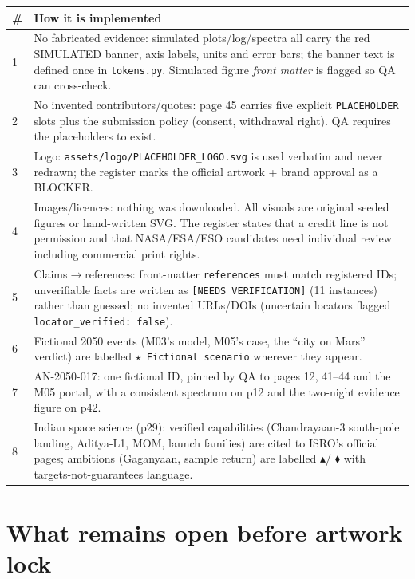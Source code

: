 \documentclass[11pt,a4paper]{article}
\newcommand{\code}[1]{\texttt{#1}}
\begin{document}
\begin{longtable}{p{8mm}p{138mm}}
\textbf{\#} & \textbf{How it is implemented}\\
\endhead
1 & No fabricated evidence: simulated plots/log/spectra all carry the red
SIMULATED banner, axis labels, units and error bars; the banner text is
defined once in \code{tokens.py}. Simulated figure \emph{front matter} is
flagged so QA can cross-check.\\
2 & No invented contributors/quotes: page 45 carries five explicit
\texttt{PLACEHOLDER} slots plus the submission policy (consent, withdrawal
right). QA requires the placeholders to exist.\\
3 & Logo: \code{assets/logo/PLACEHOLDER\_LOGO.svg} is used verbatim and never
redrawn; the register marks the official artwork + brand approval as a
BLOCKER.\\
4 & Images/licences: nothing was downloaded. All visuals are original seeded
figures or hand-written SVG. The register states that a credit line is not
permission and that NASA/ESA/ESO candidates need individual review including
commercial print rights.\\
5 & Claims$\to$references: front-matter \code{references} must match
registered IDs; unverifiable facts are written as
\texttt{[NEEDS VERIFICATION]} (11 instances) rather than guessed; no invented
URLs/DOIs (uncertain locators flagged \code{locator\_verified: false}).\\
6 & Fictional 2050 events (M03's model, M05's case, the ``city on Mars''
verdict) are labelled \texttt{$\star$ Fictional scenario} wherever they
appear.\\
7 & AN-2050-017: one fictional ID, pinned by QA to pages 12, 41--44 and the
M05 portal, with a consistent spectrum on p12 and the two-night evidence
figure on p42.\\
8 & Indian space science (p29): verified capabilities (Chandrayaan-3 south-pole
landing, Aditya-L1, MOM, launch families) are cited to ISRO's official pages;
ambitions (Gaganyaan, sample return) are labelled \texttt{$\blacktriangle$}/
\texttt{$\blacklozenge$} with targets-not-guarantees language.\\
\end{longtable}

\section{What remains open before artwork lock}
\end{document}
